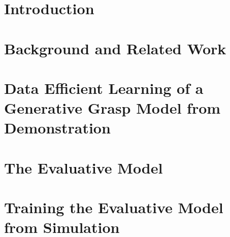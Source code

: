 \documentclass[conference]{IEEEtrans}
\begin{document}
\begin{abstract}

\end{abstract}

\IEEEpeerreviewmaketitle

\section{Introduction}
% 
% 



\section{Background and Related Work}

% 
% 
% 
% 



\section{Data Efficient Learning of a Generative Grasp Model from Demonstration}

 \label{section:generative}

\section{The Evaluative Model} \label{section:learning}



\section{Training the Evaluative Model from Simulation} \label{section:simulation}

\end{document}
